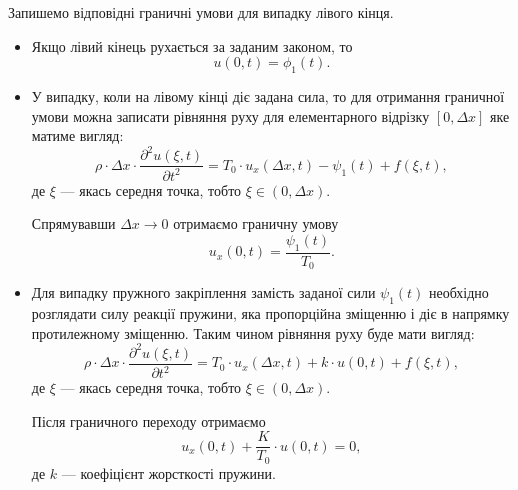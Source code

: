 Запишемо відповідні граничні умови для випадку лівого кінця.
\begin{itemize}
	\item Якщо лівий кінець рухається за заданим законом, то 
	\begin{equation}
		u(0, t) = \phi_1(t).
	\end{equation}
	\item У випадку, коли на лівому кінці діє задана сила, то для отримання граничної умови  можна записати рівняння руху для елементарного відрізку $[0, \Delta x]$  яке матиме вигляд:
	\begin{equation}
		\rho \cdot \Delta x \cdot \frac{\partial^2 u(\xi, t)}{\partial t^2} = T_0 \cdot u_x(\Delta x, t) - \psi_1(t) + f(\xi, t),
	\end{equation}
	де $\xi$ --- якась середня точка, тобто $\xi \in (0, \Delta x)$. \medskip
 
	Спрямувавши $\Delta x \to 0$ отримаємо граничну умову 
	\begin{equation}
		u_x(0, t) = \frac{\psi_1(t)}{T_0}.
	\end{equation}

	\item Для випадку пружного закріплення замість заданої сили $\psi_1(t)$ необхідно розглядати силу реакції пружини, яка пропорційна зміщенню і діє в напрямку протилежному зміщенню. Таким чином рівняння руху буде мати вигляд:
	\begin{equation}
		\rho \cdot \Delta x \cdot \frac{\partial^2 u(\xi, t)}{\partial t^2} = T_0 \cdot u_x(\Delta x, t) + k \cdot u(0, t) + f(\xi, t),
	\end{equation}
	де $\xi$ --- якась середня точка, тобто $\xi \in (0, \Delta x)$. \medskip

	Після граничного переходу отримаємо 
	\begin{equation}
		u_x(0, t) + \frac{K}{T_0} \cdot u(0, t) = 0,	
	\end{equation}
	де $k$ --- коефіцієнт жорсткості пружини.
\end{itemize}

